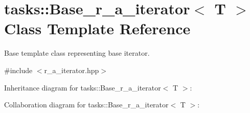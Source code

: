 \hypertarget{classtasks_1_1Base__r__a__iterator}{}\section{tasks\+:\+:Base\+\_\+r\+\_\+a\+\_\+iterator$<$ T $>$ Class Template Reference}
\label{classtasks_1_1Base__r__a__iterator}


Base template class representing base iterator.  




{\ttfamily \#include $<$r\+\_\+a\+\_\+iterator.\+hpp$>$}



Inheritance diagram for tasks\+:\+:Base\+\_\+r\+\_\+a\+\_\+iterator$<$ T $>$\+:


Collaboration diagram for tasks\+:\+:Base\+\_\+r\+\_\+a\+\_\+iterator$<$ T $>$\+:
